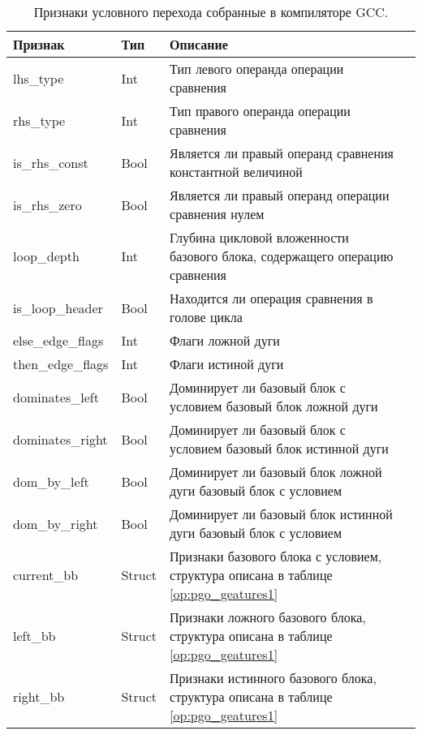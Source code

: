 \begin{table} [htbp]
	\centering
	\begin{threeparttable}%
		\caption{Признаки условного перехода собранные в компиляторе GCC.}\label{op:pgo_geatures2}%
		\begin{tabular}{| m{4cm} | m{2cm} |  m{9cm}l |}
		\hline
			\hline
			\centering \textbf{Признак}			 & \centering  \textbf{Тип} &  \centering  \textbf{Описание} & \\
			\hline
			\centering lhs\_type			 & \centering  Int &   Тип левого операнда операции сравнения & \\
			\hline
			\centering rhs\_type			 & \centering  Int &    Тип правого операнда операции сравнения & \\
			\hline
			\centering is\_rhs\_const			 & \centering  Bool &    Является ли правый операнд сравнения константной величиной & \\
			\hline
			\centering is\_rhs\_zero			 & \centering  Bool &    Является ли правый операнд операции сравнения нулем & \\
			\hline
			\centering loop\_depth			 & \centering  Int &    Глубина цикловой вложенности базового блока, содержащего операцию сравнения & \\
			\hline
			\centering is\_loop\_header			 & \centering  Bool &    Находится ли операция сравнения в голове цикла  & \\
			\hline
			\centering else\_edge\_flags			 & \centering  Int &    Флаги ложной дуги & \\
			\hline
			\centering then\_edge\_flags			 & \centering  Int &    Флаги истиной дуги & \\
			\hline
			\centering dominates\_left			 & \centering  Bool &    Доминирует ли базовый блок с условием  базовый блок ложной дуги   & \\	
			\hline
			\centering dominates\_right			 & \centering  Bool &    Доминирует ли базовый блок с условием  базовый блок истинной дуги  & \\	
			\hline
			\centering dom\_by\_left			 & \centering  Bool &    Доминирует ли базовый блок ложной дуги базовый блок с условием  & \\	
			\hline
			\centering dom\_by\_right			 & \centering  Bool &    Доминирует ли базовый блок истинной дуги базовый блок с условием  & \\	
			\hline
			\centering current\_bb			 & \centering  Struct &    Признаки базового блока с условием, структура описана в таблице \ref{op:pgo_geatures1}  & \\	
			\hline
			\centering left\_bb			 & \centering  Struct &     Признаки ложного базового блока, структура описана в таблице \ref{op:pgo_geatures1} & \\	
			\hline
			\centering right\_bb			 & \centering  Struct &    Признаки истинного базового блока, структура описана в таблице \ref{op:pgo_geatures1} & \\	
			\hline
			\hline
		\end{tabular}
	\end{threeparttable}
\end{table}
